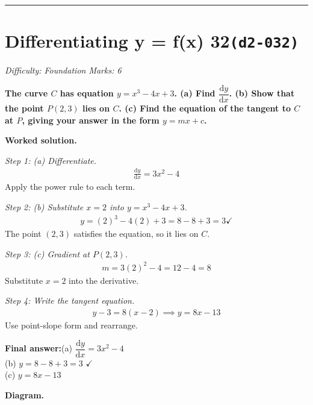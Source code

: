 \documentclass[11pt]{article}
\newcommand{\question}[1]{\par\medskip\noindent\textbf{#1}\par}
\begin{document}
\medskip\hrule

\section*{Differentiating y = f(x) 32\quad\small\texttt{(d2-032)}}
\textit{Difficulty: Foundation \quad\textbar\quad Marks: 6}

\question{The curve \( C \) has equation \( y = x^3 - 4x + 3 \). (a) Find \( \dfrac{\mathrm{d}y}{\mathrm{d}x} \). (b) Show that the point \( P(2, 3) \) lies on \( C \). (c) Find the equation of the tangent to \( C \) at \( P \), giving your answer in the form \( y = mx + c \).}

\textbf{Worked solution.}

\textit{Step 1: (a) Differentiate.}
\[\begin{gathered}
\frac{\mathrm{d}y}{\mathrm{d}x} = 3x^2 - 4
\end{gathered}\]
Apply the power rule to each term.

\textit{Step 2: (b) Substitute \( x = 2 \) into \( y = x^3 - 4x + 3 \).}
\[\begin{gathered}
y = (2)^3 - 4(2) + 3 = 8 - 8 + 3 = 3 \checkmark
\end{gathered}\]
The point \( (2, 3) \) satisfies the equation, so it lies on \( C \).

\textit{Step 3: (c) Gradient at \( P(2, 3) \).}
\[\begin{gathered}
m = 3(2)^2 - 4 = 12 - 4 = 8
\end{gathered}\]
Substitute \( x = 2 \) into the derivative.

\textit{Step 4: Write the tangent equation.}
\[\begin{gathered}
y - 3 = 8(x - 2) \implies y = 8x - 13
\end{gathered}\]
Use point-slope form and rearrange.

\begin{answerbox}
\textbf{Final answer:}\quad (a) \(\displaystyle  \dfrac{\mathrm{d}y}{\mathrm{d}x} = 3x^2 - 4 \) \\[3pt]  (b) \(\displaystyle  y = 8 - 8 + 3 = 3 \) $\checkmark$ \\[3pt]  (c) \(\displaystyle  y = 8x - 13 \)
\end{answerbox}
\textbf{Diagram.}
\end{document}
